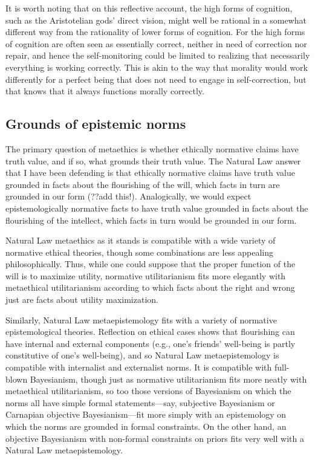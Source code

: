 It is worth noting that on this reflective account, the high forms of cognition, such as the 
Aristotelian gods' direct vision, might well be rational in a somewhat different way from the rationality 
of lower forms of cognition. For the high forms of cognition 
are often seen as essentially correct, neither in need of correction nor repair, and hence the 
self-monitoring could be limited to realizing that necessarily everything is working correctly. 
This is akin to the way that morality would work differently for a perfect being that does not need 
to engage in self-correction, but that knows that it always functions morally correctly. 

\subsection{Grounds of epistemic norms}
The primary question of metaethics is whether ethically normative claims have truth value, and if so, what grounds their truth value.
The Natural Law answer that I have been defending is that ethically normative claims have truth value grounded in facts about the 
flourishing of the will, which facts in turn are grounded in our form (??add this!). Analogically, we would expect epistemologically 
normative facts to have truth value grounded in facts about the flourishing of the intellect, which facts in turn would be grounded
in our form.

Natural Law metaethics as it stands is compatible with a wide variety of normative ethical theories, though some combinations are
less appealing philosophically. Thus, while one could suppose that the proper function of the will is to maximize utility, 
normative utilitarianism fits more elegantly with metaethical utilitarianism according to which facts about the right
and wrong just are facts about utility maximization. 

Similarly, Natural Law metaepistemology fits with a variety of normative epistemological theories. Reflection on ethical cases
shows that flourishing can have internal and external components (e.g., one's friends' well-being is partly constitutive of one's 
well-being), and so Natural Law metaepistemology is compatible with internalist and externalist norms. It is compatible with 
full-blown Bayesianism, though just as normative utilitarianism fits more neatly with metaethical utilitarianism, so too those
versions of Bayesianism on which the norms all have simple formal statements---say, subjective Bayesianism or Carnapian objective
Bayesianism---fit more simply with an epistemology on which the norms are grounded in formal constraints. On the other hand, an
objective Bayesianism with non-formal constraints on priors fits very well with a Natural Law metaepistemology.

